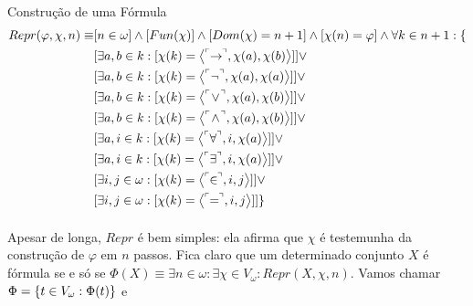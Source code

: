         \begin{definition}{Construção de uma Fórmula}
            \begin{align*}
                Repr(\varphi, \chi, n) \equiv &[n \in \omega] \land [Fun(\chi)] \land [Dom(\chi) = n+1] \land [\chi(n) = \varphi] \land \forall k\in n+1:\{\\
                    &[\exists a,b  \in k     : [\chi(k) = \TUPLE{ \FMLA{\!\!\rar\!\!} }{\chi(a)}{\chi(b)}] ] \lor \\
                    &[\exists a,b  \in k     : [\chi(k) = \TUPLE{ \FMLA{\neg}         }{\chi(a)}{\chi(a)}] ] \lor \\
                    &[\exists a,b  \in k     : [\chi(k) = \TUPLE{ \FMLA{  \!\lor\!  } }{\chi(a)}{\chi(b)}] ] \lor \\
                    &[\exists a,b  \in k     : [\chi(k) = \TUPLE{ \FMLA{  \!\land\!  }}{\chi(a)}{\chi(b)}] ] \lor \\
                    &[\exists a,i  \in k     : [\chi(k) = \TUPLE{ \FMLA{\forall}      }{   i   }{\chi(a)}] ] \lor \\
                    &[\exists a,i  \in k     : [\chi(k) = \TUPLE{ \FMLA{\exists}      }{   i   }{\chi(a)}] ] \lor \\
                    &[\exists i, j \in \omega: [\chi(k) = \TUPLE{ \FMLA{\!\!\in\!\!}  }{   i   }{   j   }] ] \lor \\
                    &[\exists i, j \in \omega: [\chi(k) = \TUPLE{ \FMLA{\!\! = \!\!}  }{   i   }{   j   }] ] \}
            \end{align*}
        \end{definition}

        \paragraph{}
            Apesar de longa, $Repr$ é bem simples: ela afirma que $\chi$ é testemunha da construção de $\varphi$ em $n$ passos. Fica claro que 
            um determinado conjunto $X$ é fórmula se e só se $\Phi(X)\equiv\exists n\in\omega:\exists \chi \in V_\omega: Repr(X, \chi, n)$. Vamos chamar  
            $\Phi = \SET{t\in V_\omega: \Phi(t)}$ e 

